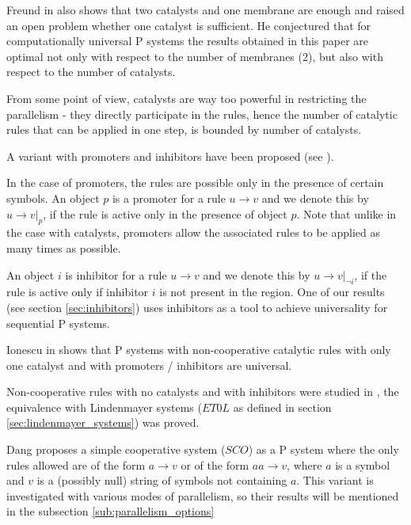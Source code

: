 
Freund in \cite{Freund2005TwoCatalysts} also shows that two catalysts and one membrane are enough and raised an open problem whether one catalyst is sufficient. He conjectured that for computationally universal P systems the results obtained in this paper are optimal not only with respect to the number of membranes (2), but also with respect to the number of catalysts.


From some point of view, catalysts are way too powerful in restricting the parallelism - they directly participate in the rules, hence the number of catalytic rules that can be applied in one step, is bounded by number of catalysts.

A variant with promoters and inhibitors have been proposed (see \cite{Ionescu:jucs_10_5:on_p_systems_with}).


In the case of promoters, the rules are possible only in the presence of certain symbols. An object $p$ is a promoter for a rule $u\rightarrow v$ and we denote this by $u\rightarrow v|_{p}$, if the rule is active only in the presence of object $p$. Note that unlike in the case with catalysts, promoters allow the associated rules to be applied as many times as possible.


An object $i$ is inhibitor for a rule $u\rightarrow v$ and we denote this by $u\rightarrow v|_{\neg i}$, if the rule is active only if inhibitor $i$ is not present in the region.
One of our results (see section \ref{sec:inhibitors}) uses inhibitors as a tool to achieve universality for sequential P systems.



Ionescu in \cite{Ionescu:jucs_10_5:on_p_systems_with} shows that P systems with non-cooperative catalytic rules with only one catalyst and with promoters / inhibitors are universal.


Non-cooperative rules with no catalysts and with inhibitors were studied in \cite{Sburlan:2006:FurtherResultsPromotersInhibitors}, the equivalence with Lindenmayer systems ($ET0L$ as defined in section \ref{sec:lindenmayer_systems}) was proved.


Dang \cite{Ibarra04dang} proposes a simple cooperative system ($SCO$) as a P system where the only rules allowed are of the form $a\rightarrow v$ or of the form $aa\rightarrow v$, where $a$ is a symbol and $v$ is a (possibly null) string of symbols not containing $a$. This variant is investigated with various modes of parallelism, so their results will be mentioned in the subsection \ref{sub:parallelism_options}


